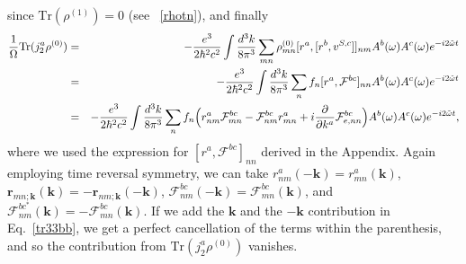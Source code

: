 \documentclass[floatfix,prb,aps,superscriptaddress,11pt]{revtex4}
\begin{document}
since $\mbox{Tr}({\rho}^{(1)})=0$ (see ~\eqref{rhotn}), and finally 
\begin{eqnarray}
\frac{1}{\Omega}\mbox{Tr}(j_{2}^{a}{\rho}^{(0)}) &=&-\frac{e^{3}}{2\hbar ^{2}c^{2}}
\int \frac{d^{3}k}{8\pi^3}
\sum_{mn}{\rho}
_{mn}^{(0)}[r^{a},[r^{b},v^{S,c}]]_{nm}
A^{b}(\omega)A^{c}(\omega)
e^{-i2\tilde{\omega} t}
\notag  \label{tr33bb} \\
&=&-\frac{e^{3}}{2\hbar ^{2}c^{2}}\int \frac{d^{3}k}{8\pi ^{3}}
\sum_{n}f_{n}[r^{a},\mathcal{F}^{bc}]_{nn}
A^{b}(\omega)A^{c}(\omega)
e^{-i2\tilde{\omega} t}
\notag \\
&=&-\frac{e^{3}}{2\hbar ^{2}c^{2}}\int \frac{d^{3}k}{8\pi ^{3}}\sum_{n}f_{n}
\Big(r_{nm}^{a}\mathcal{F}_{mn}^{bc}-\mathcal{F}_{nm}^{bc}r_{mn}^{a}+i\frac{
\partial }{\partial k^{a}}\mathcal{F}_{e,nn}^{bc}\Big)
A^{b}(\omega)A^{c}(\omega)
e^{-i2\tilde{\omega} t}
,
\end{eqnarray}
where we used the expression for $[r^{a},\mathcal{F}^{bc}]_{nn}$ derived in
the Appendix. Again employing time reversal symmetry, we can take $
r_{nm}^{a}(-\mathbf{k})=r_{mn}^{a}(\mathbf{k})$, $\mathbf{r}_{mn;\mathbf{k}}(\mathbf{k})=-\mathbf{r}_{nm;\mathbf{k}}(-
\mathbf{k})$,
$\mathcal{F}_{nm}^{bc}(-\mathbf{k})=\mathcal{F}_{mn}^{bc}(\mathbf{k})$,
and $\mathcal{F}_{nm}^{bc^{\ast }}(\mathbf{k})=-\mathcal{F}
_{mn}^{bc}(\mathbf{k})$. If we add the $\mathbf{k}$ and the $-\mathbf{k}$ contribution
in Eq.~\eqref{tr33bb}, we get a perfect cancellation of the terms within the
parenthesis, and so the contribution from $\mbox{Tr}(j_{2}^{a}{\rho}^{(0)})$
vanishes.
\end{document}
